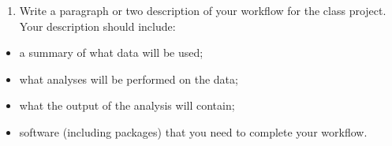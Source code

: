 \documentclass[]{article}
\providecommand{\tightlist}{%
  \setlength{\itemsep}{0pt}\setlength{\parskip}{0pt}}
\begin{document}
\begin{enumerate}
\def\labelenumi{\arabic{enumi}.}
\setcounter{enumi}{2}
\tightlist
\item
  Write a paragraph or two description of your workflow for the class
  project. Your description should include:
\end{enumerate}

\begin{itemize}
\tightlist
\item
  a summary of what data will be used;
\item
  what analyses will be performed on the data;
\item
  what the output of the analysis will contain;
\item
  software (including packages) that you need to complete your workflow.
\end{itemize}
\end{document}
